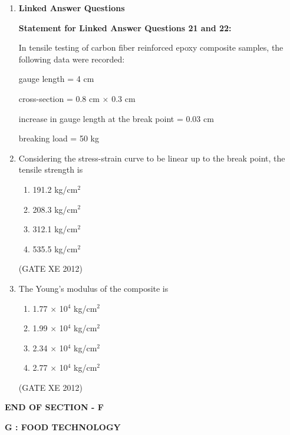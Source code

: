 \documentclass[12pt]{article}
\begin{document}
\begin{enumerate}
\item[] {\large \textbf{Linked Answer Questions}} 

\textbf{Statement for Linked Answer Questions 21 and 22:} 

In tensile testing of carbon fiber reinforced epoxy composite samples, the following data were recorded: 
\begin{center}
gauge length = 4 cm 

cross-section = 0.8 cm $\times$ 0.3 cm 

increase in gauge length at the break point = 0.03 cm 

breaking load = 50 kg 
\end{center}

  \item Considering the stress-strain curve to be linear up to the break point, the tensile strength is
  \begin{multicols}{2}
  \begin{enumerate}
    \item 191.2 kg/cm$^2$
    \item 208.3 kg/cm$^2$
    \item 312.1 kg/cm$^2$
    \item 535.5 kg/cm$^2$
  \end{enumerate}
  \end{multicols}
  (GATE XE 2012)

  \item The Young’s modulus of the composite is
  \begin{multicols}{2}
  \begin{enumerate}
    \item 1.77 $\times$ 10$^4$ kg/cm$^2$
    \item 1.99 $\times$ 10$^4$ kg/cm$^2$
    \item 2.34 $\times$ 10$^4$ kg/cm$^2$
    \item 2.77 $\times$ 10$^4$ kg/cm$^2$
  \end{enumerate}
  \end{multicols}
  (GATE XE 2012)

\end{enumerate}

\begin{center}
\textbf{END OF SECTION - F}
\end{center}

\newpage

\begin{center}
{\Large\textbf{G : FOOD TECHNOLOGY}}
\end{center}
\end{document}
